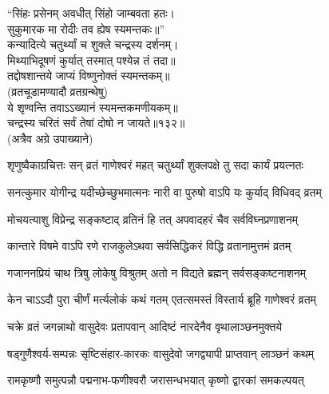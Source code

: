 
“सिंहः प्रसेनम् अवधीत् सिंहो जाम्बवता हतः।\\
सुकुमारक मा रोदीः तव ह्येष स्यमन्तकः॥”\\

कन्यादित्ये चतुर्थ्यां च शुक्ले चन्द्रस्य दर्शनम्।\\
मिथ्याभिदूषणं कुर्यात् तस्मात् पश्येन्न तं तदा॥\\
तद्दोषशान्तये जाप्यं विष्णुनोक्तं स्यमन्तकम्॥\\
(व्रतचूडामण्यादौ व्रतग्रन्थेषु)\\

ये शृण्वन्ति तवाऽऽख्यानं स्यमन्तकमणीयकम्॥ \\
चन्द्रस्य चरितं सर्वं तेषां दोषो न जायते॥१३२॥\\
(अत्रैव अग्रे उपाख्याने)\\


\twolineshloka
{शृणुष्वैकाग्रचित्तः सन् व्रतं गाणेश्वरं महत्}
{चतुर्थ्यां शुक्लपक्षे तु सदा कार्यं प्रयत्नतः}%

\twolineshloka
{सनत्कुमार योगीन्द्र यदीच्छेच्छुभमात्मनः}
{नारी वा पुरुषो वाऽपि यः कुर्याद् विधिवद् व्रतम्}%

\twolineshloka
{मोचयत्याशु विप्रेन्द्र सङ्कष्टाद् व्रतिनं हि तत्}
{अपवादहरं चैव सर्वविघ्नप्रणाशनम्}%

\twolineshloka
{कान्तारे विषमे वाऽपि रणे राजकुलेऽथवा}
{सर्वसिद्धिकरं विद्धि व्रतानामुत्तमं व्रतम्}%

\twolineshloka
{गजाननप्रियं चाथ त्रिषु लोकेषु विश्रुतम्}
{अतो न विद्यते ब्रह्मन् सर्वसङ्कष्टनाशनम्}%


\twolineshloka
{केन चाऽऽदौ पुरा चीर्णं मर्त्यलोकं कथं गतम्}
{एतत्समस्तं विस्तार्य ब्रूहि गाणेश्वरं व्रतम्}%

\twolineshloka
{चक्रे व्रतं जगन्नाथो वासुदेवः प्रतापवान्}
{आदिष्टं नारदेनैव वृथालाञ्छनमुक्तये}%

\twolineshloka
{षड्गुणैश्वर्य-सम्पन्नः सृष्टिसंहार-कारकः} 
{वासुदेवो जगद्व्यापी प्राप्तवान् लाञ्छनं कथम्}%



\twolineshloka
{रामकृष्णौ समुत्पन्नौ पद्मनाभ-फणीश्वरौ}
{जरासन्धभयात् कृष्णो द्वारकां समकल्पयत्}%

